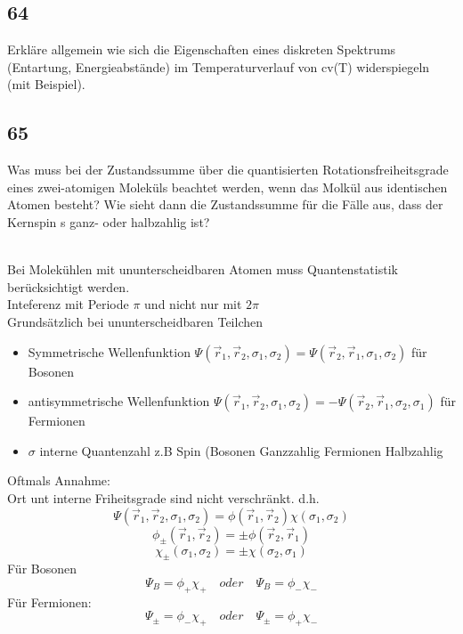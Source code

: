 \subsection{64}
\begin{myfrag}
Erkläre allgemein wie sich die Eigenschaften eines diskreten Spektrums
(Entartung, Energieabstände) im Temperaturverlauf von cv(T) widerspiegeln
(mit Beispiel).
\end{myfrag}
\subsection{65}
\begin{myfrag}
Was muss bei der Zustandssumme über die quantisierten
Rotationsfreiheitsgrade eines zwei-atomigen Moleküls beachtet werden, wenn
das Molkül aus identischen Atomen besteht? Wie sieht dann die
Zustandssumme für die Fälle aus, dass der Kernspin s ganz- oder halbzahlig
ist?
\end{myfrag} \quad \\
Bei Molekühlen mit ununterscheidbaren Atomen muss Quantenstatistik berücksichtigt werden. \\
Inteferenz mit Periode $\pi $ und nicht nur mit $ 2 \pi $ \\[1.5ex]
Grundsätzlich bei ununterscheidbaren Teilchen 
\\
\begin{itemize}
\item Symmetrische Wellenfunktion $ \Psi (\vec{r} _1 , \vec{r}_2 , \sigma _1 , \sigma _2 ) = \Psi (\vec{r} _2 , \vec{r}_1 , \sigma _1 , \sigma _2 ) $ für Bosonen
\item antisymmetrische Wellenfunktion $\Psi (\vec{r} _1 , \vec{r}_2 , \sigma _1 , \sigma _2 ) = - \Psi (\vec{r} _2 , \vec{r}_1 , \sigma _2 , \sigma _1 )$ für Fermionen
\item $\sigma $ \glqq interne \grqq Quantenzahl z.B Spin (Bosonen Ganzzahlig Fermionen Halbzahlig
\end{itemize}
Oftmals Annahme: \\[1.5ex] 
Ort unt interne Friheitsgrade sind nicht verschränkt.
d.h. $$\Psi (\vec{r} _1 , \vec{r}_2 , \sigma _1 , \sigma _2 ) = \phi (\vec{r} _1 , \vec{r}_2) \chi ( \sigma _1 , \sigma _2 )$$
$$ \phi _\pm (\vec{r} _1 , \vec{r}_2) = \pm \phi (\vec{r} _2 , \vec{r}_1)$$
$$\chi_\pm ( \sigma _1 , \sigma _2 ) = \pm \chi ( \sigma _2 , \sigma _1 )$$
Für Bosonen $$ \Psi_B = \phi_+ \chi_+ \quad oder \quad \Psi_B = \phi_-\chi_- $$
Für Fermionen: $$ \Psi_\pm = \phi_- \chi_+ \quad oder \quad \Psi_\pm = \phi_+\chi_-$$

